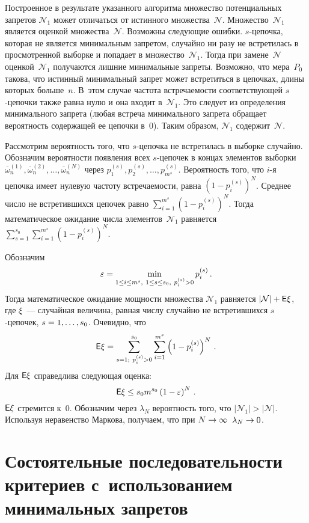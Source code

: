 \begin{multicols}{2}
  Построенное в результате указанного алгоритма множество потенциальных 
запретов $\mathcal{N}_1$ может отличаться от истинного множества~$\mathcal{N}$. 
Множество~$\mathcal{N}_1$ является оценкой множества~$\mathcal{N}$. Возможны 
следующие ошибки. $s$-це\-поч\-ка, которая не является минимальным 
запретом, случайно ни разу не встретилась в просмотренной выборке и 
попадает в множество~$\mathcal{N}_1$. Тогда при замене~$\mathcal{N}$ 
оценкой~$\mathcal{N}_1$ получаются лишние минимальные запреты. Возможно, 
что мера~$P_0$ такова, что истинный минимальный запрет может встретиться 
в цепочках, длины которых больше~$n$. В~этом случае частота встречаемости 
соответствующей $s$-це\-поч\-ки также равна нулю и она входит в~$\mathcal{N}_1$. 
Это следует из определения минимального запрета (любая встреча 
минимального запрета обращает вероятность содержащей ее цепочки в~0). 
Таким образом, $\mathcal{N}_1$ содержит~$\mathcal{N}$. 
  
  Рассмотрим вероятность того, что $s$-це\-поч\-ка не встретилась в выборке 
случайно. Обозначим вероятности появления всех $s$-це\-по\-чек в концах 
элементов выборки $\overline{\omega}_n^{(1)}, \overline{\omega}_n^{(2)}, \ldots 
, \overline{\omega}_n^{(N)}$ через $p_1^{(s)},p_2^{(s)}, \ldots , p^{(s)}_{m^s}$. 
Вероятность того, что $i$-я цепочка имеет нулевую частоту встречаемости, 
равна $(1-p_i^{(s)})^N$. Среднее число не встретившихся цепочек равно 
$\sum\limits_{i=1}^{m^s}\left(1-p_i^{(s)}\right)^N$. Тогда математическое ожидание 
числа элементов~$\mathcal{N}_1$ равняется 
   $
   \sum\limits_{s=1}^{s_0} \sum\limits_{i=1}^{m^s} \left( 1-p_i^{(s)}\right)^N   $.
  
  Обозначим 
  $$
  \varepsilon \hm=\min\limits_{1\leq i\leq m^s,\ 1\leq s\leq s_0,\ 
p_i^{(s)}>0} p_i^{(s)}\,.$$ 
Тогда математическое ожидание мощности множества 
$\mathcal{N}_1$ равняется $\vert \mathcal{N}\vert +{\sf E}\xi$, где $\xi$~--- случайная 
величина, равная числу случайно не встретившихся $s$-це\-по\-чек, 
$s\hm=1,\ldots , s_0$. Очевидно, что
  $$
{\sf  E}\xi =\sum\limits_{s=1;\ p_i^{(s)}>0}^{s_0} \sum\limits_{i=1}^{m^s} \left( 1-
p_i^{(s)}\right)^N\,.
  $$
Для ${\sf E}\xi$ справедлива следующая оценка:
$$
{\sf E}\xi \leq s_0 m^{s_0}\left( 1-\varepsilon\right)^N\,.
$$
${\sf E}\xi$ стремится к~0. Обозначим через $\lambda_N$ вероятность того, что 
$\vert \mathcal{N}_1\vert > \vert \mathcal{N}\vert$. Используя неравенство 
Маркова, получаем, что при $N\hm\rightarrow\infty$\ $\lambda_N\hm\rightarrow 
0$. 
\section{Состоятельные последовательности критериев 
с~использованием минимальных запретов}


\end{multicols}
